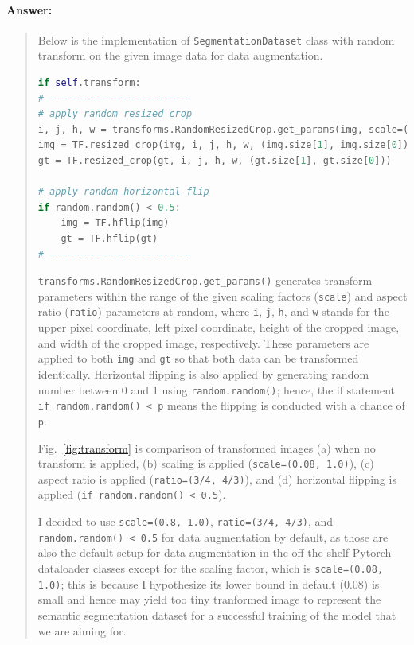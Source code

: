 \documentclass[9pt]{article}
\begin{document}
\paragraph{Answer:} 
\begin{quote}

Below is the implementation of \texttt{SegmentationDataset} class with random transform on the given image data for data augmentation.

\begin{lstlisting}[language=Python, basicstyle=\scriptsize]
if self.transform:
# -------------------------
# apply random resized crop
i, j, h, w = transforms.RandomResizedCrop.get_params(img, scale=(0.8,1), ratio=(3/4,4/3))
img = TF.resized_crop(img, i, j, h, w, (img.size[1], img.size[0]))
gt = TF.resized_crop(gt, i, j, h, w, (gt.size[1], gt.size[0]))

# apply random horizontal flip
if random.random() < 0.5:
    img = TF.hflip(img)
    gt = TF.hflip(gt)
# -------------------------
\end{lstlisting}

\texttt{transforms.RandomResizedCrop.get\_params()} generates transform parameters within the range of the given scaling factors (\texttt{scale}) and aspect ratio (\texttt{ratio}) parameters at random, where \texttt{i}, \texttt{j}, \texttt{h}, and \texttt{w} stands for the upper pixel coordinate, left pixel coordinate, height of the cropped image, and width of the cropped image, respectively. These parameters are applied to both \texttt{img} and \texttt{gt} so that both data can be transformed identically. Horizontal flipping is also applied by generating random number between 0 and 1 using \texttt{random.random()}; hence, the if statement \texttt{if random.random() < p} means the flipping is conducted with a chance of \texttt{p}. 

Fig.~\ref{fig:transform} is comparison of transformed images (a) when no transform is applied, (b) scaling is applied (\texttt{scale=(0.08, 1.0)}), (c) aspect ratio is applied (\texttt{ratio=(3/4, 4/3)}), and (d) horizontal flipping is applied (\texttt{if random.random() < 0.5}). 

I decided to use \texttt{scale=(0.8, 1.0)}, \texttt{ratio=(3/4, 4/3)}, and \texttt{random.random() < 0.5} for data augmentation by default, as those are also the default setup for data augmentation in the off-the-shelf Pytorch dataloader classes except for the scaling factor, which is \texttt{scale=(0.08, 1.0)}; this is because I hypothesize its lower bound in default (0.08) is small and hence may yield too tiny tranformed image to represent the semantic segmentation dataset for a successful training of the model that we are aiming for. 


\end{quote}
\end{document}
